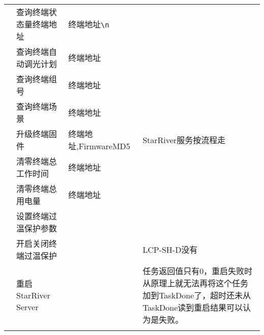 \begin{longtabu}[c]{@{}rXXX@{}}
\\ & 查询终端状态量终端地址 & 终端地址\texttt{\textbackslash{}n} &
\\ & 查询终端自动调光计划 & 终端地址 &
\\ & 查询终端组号 & 终端地址 &
\\ & 查询终端场景 & 终端地址 &
\\ & 升级终端固件 & 终端地址,FirmwareMD5 & StarRiver服务按流程走
\\ & 清零终端总工作时间 & 终端地址 &
\\ & 清零终端总用电量 & 终端地址 &
\\ & 设置终端过温保护参数 & &
\\ & 开启关闭终端过温保护 & & LCP-SH-D没有
\\ & 重启StarRiver Server & &
任务返回值只有0，重启失败时从原理上就无法再将这个任务加到TaskDone了，超时还未从TaskDone读到重启结果可以认为是失败。
\\\addlinespace
\bottomrule
\end{longtabu}
